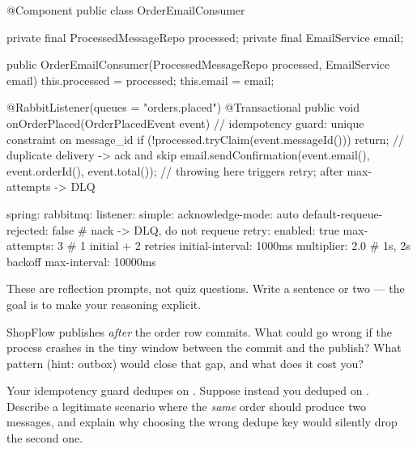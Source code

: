 \begin{javabox}
@Component
public class OrderEmailConsumer {

  private final ProcessedMessageRepo processed;
  private final EmailService email;

  public OrderEmailConsumer(ProcessedMessageRepo processed, EmailService email) {
    this.processed = processed;
    this.email = email;
  }

  @RabbitListener(queues = "orders.placed")
  @Transactional
  public void onOrderPlaced(OrderPlacedEvent event) {
    // idempotency guard: unique constraint on message_id
    if (!processed.tryClaim(event.messageId())) {
      return;                 // duplicate delivery -> ack and skip
    }
    email.sendConfirmation(event.email(), event.orderId(), event.total());
    // throwing here triggers retry; after max-attempts -> DLQ
  }
}
\end{javabox}

\begin{yamlbox}
spring:
  rabbitmq:
    listener:
      simple:
        acknowledge-mode: auto
        default-requeue-rejected: false   # nack -> DLQ, do not requeue
        retry:
          enabled: true
          max-attempts: 3                 # 1 initial + 2 retries
          initial-interval: 1000ms
          multiplier: 2.0                 # 1s, 2s backoff
          max-interval: 10000ms
\end{yamlbox}


These are reflection prompts, not quiz questions. Write a sentence or two --- the goal is to make your reasoning explicit.

\begin{thinkbox}
ShopFlow publishes  \emph{after} the order row commits. What could go wrong if the process crashes in the tiny window between the commit and the publish? What pattern (hint: outbox) would close that gap, and what does it cost you?
\end{thinkbox}

\begin{thinkbox}
Your idempotency guard dedupes on . Suppose instead you deduped on . Describe a legitimate scenario where the \emph{same} order should produce two messages, and explain why choosing the wrong dedupe key would silently drop the second one.
\end{thinkbox}

